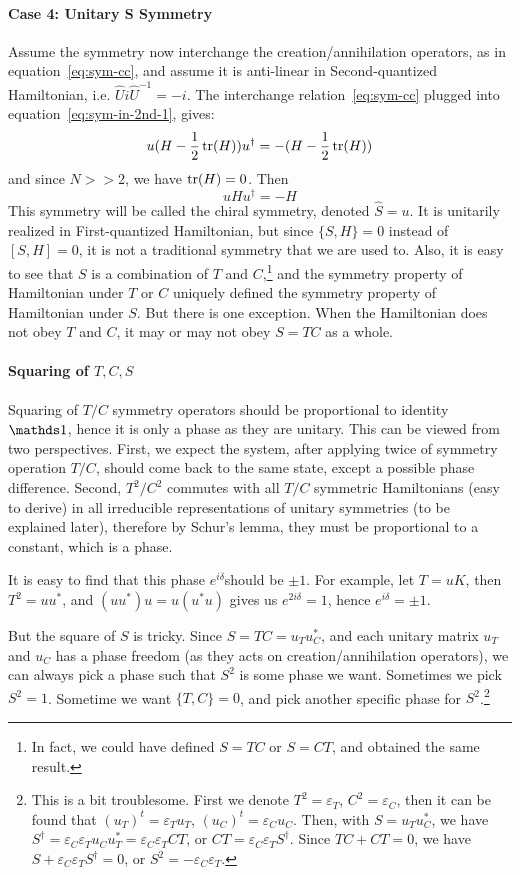 \paragraph{Case 4: Unitary S Symmetry}
Assume the symmetry now interchange the creation/annihilation operators, as in
equation~\ref{eq:sym-cc}, and assume it is anti-linear in Second-quantized
Hamiltonian, i.e. $\hat{U}i\hat{U}^{-1}=-i$. The interchange
relation~\ref{eq:sym-cc} plugged into equation~\ref{eq:sym-in-2nd-1}, gives:
\begin{equation}
\label{eq:sym-S-cond}
u (H-\frac{1}{2}\tr(H)) u^\dagger = - (H-\frac{1}{2}\tr(H))
\end{equation}
and since $N>>2$, we have $\tr(H)=0$. Then
\begin{equation}
u H u^\dagger = -H
\end{equation}
This symmetry will be called the chiral symmetry, denoted $\hat{S}=u$. It is
unitarily realized in First-quantized Hamiltonian, but since $\{S,H\}=0$ instead
of $[S,H]=0$, it is not a traditional symmetry that we are used to. Also, it is
easy to see that $S$ is a combination of $T$ and $C$,\footnote{In fact, we could have
	defined $S=TC$ or $S=CT$, and obtained the same result.} and the symmetry
property of Hamiltonian under $T$ or $C$ uniquely defined the symmetry property
of Hamiltonian under $S$. But there is one exception. When the
Hamiltonian does not obey $T$ and $C$, it may or may not obey $S=TC$ as a
whole.

\paragraph{Squaring of $T,C,S$} 
Squaring of $T/C$ symmetry operators should be proportional to identity $\id$,
hence it is only a phase as they are unitary.
This can be viewed from two perspectives. First, we expect the system, after
applying twice of symmetry operation $T/C$, should come back to the same state, except
a possible phase difference. Second, $T^2/C^2$ commutes with all
$T/C$ symmetric Hamiltonians (easy to derive) in all irreducible representations
of unitary symmetries (to be explained later), therefore by Schur's lemma, they
must be proportional to a constant, which is a phase.

It is easy to find that this phase $e^{i\delta}$should be $\pm1$. For example, let $T=uK$,
then $T^2=uu^*$, and $(uu^*)u = u(u^*u)$ gives us $e^{2i\delta}=1$, hence
$e^{i\delta}=\pm1$.

But the square of $S$ is tricky. Since $S=TC=u_T u_C^*$, and each unitary matrix
$u_T$ and $u_C$ has a phase freedom (as they acts on creation/annihilation
operators), we can always pick a phase such that $S^2$ is some phase we want.
Sometimes we pick $S^2=1$. Sometime we want $\{T,C\}=0$, and pick another specific
phase for $S^2$.\footnote{This is a bit troublesome. First we denote
	$T^2=\varepsilon_T$, $C^2=\varepsilon_C$, then it can be found that
	$(u_T)^t=\varepsilon_T u_T$, $(u_C)^t = \varepsilon_C u_C$. Then, with
	$S=u_Tu_C^*$, we have $S^\dagger=\varepsilon_C\varepsilon_Tu_Cu_T^* =
	\varepsilon_C\varepsilon_T CT$, or $CT= \varepsilon_C\varepsilon_TS^\dagger$.
	Since $TC+CT=0$, we have $S+\varepsilon_C\varepsilon_T S^\dagger=0$, or
	$S^2=-\varepsilon_C\varepsilon_T$.}

